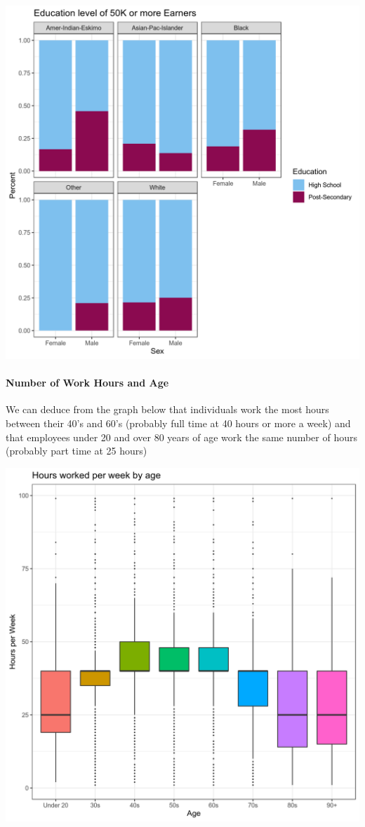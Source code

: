 \documentclass[]{article}
\let\oldparagraph\paragraph
\renewcommand{\paragraph}[1]{\oldparagraph{#1}\mbox{}}
\begin{document}
\includegraphics{../images/Plot_2_Education_Level_of_50K_or_more_Earners.png}

\hypertarget{number-of-work-hours-and-age}{%
\paragraph{Number of Work Hours and
Age}\label{number-of-work-hours-and-age}}

We can deduce from the graph below that individuals work the most hours
between their 40's and 60's (probably full time at 40 hours or more a
week) and that employees under 20 and over 80 years of age work the same
number of hours (probably part time at 25 hours)

\includegraphics{../images/Plot_3_Hours_worked_per_week_by_age.png}
\end{document}
